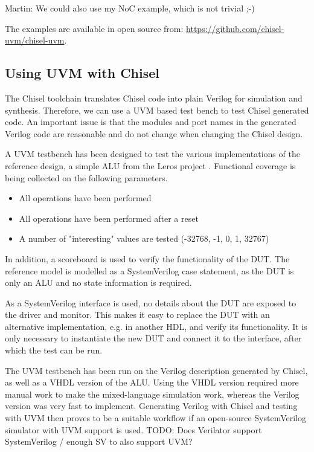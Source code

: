\documentclass[a4paper, conference]{IEEEtran}
\newcommand{\todo}[1]{{\color{olive} TODO: #1}}
\newcommand{\martin}[1]{{\color{blue} Martin: #1}}
\begin{document}
\martin{We could also use my NoC example, which is not trivial ;-)}

The examples are available in open source from: \url{https://github.com/chisel-uvm/chisel-uvm}.

\subsection{Using UVM with Chisel}

The Chisel toolchain translates Chisel code into plain Verilog for simulation and synthesis. Therefore, we can use a UVM based test bench to test Chisel generated code.
An important issue is that the modules and port names in the generated Verilog code are reasonable and do not change when changing the Chisel design.

A UVM testbench has been designed to test the various implementations of the reference design, a simple ALU from the Leros project \cite{leros:fpl2011}. Functional coverage is being collected on the following parameters.
\begin{itemize}
    \item All operations have been performed
    \item All operations have been performed after a reset
    \item A number of "interesting" values are tested (-32768, -1, 0, 1, 32767)
\end{itemize}

In addition, a scoreboard is used to verify the functionality of the DUT. The reference model is modelled as a SystemVerilog case statement, as the DUT is only an ALU and no state information is required.

As a SystemVerilog interface is used, no details about the DUT are exposed to the driver and monitor. This makes it easy to replace the DUT with an alternative implementation, e.g. in another HDL, and verify its functionality. It is only necessary to instantiate the new DUT and connect it to the interface, after which the test can be run.

The UVM testbench has been run on the Verilog description generated by Chisel, as well as a VHDL version of the ALU. Using the VHDL version required more manual work to make the mixed-language simulation work, whereas the Verilog version was very fast to implement. Generating Verilog with Chisel and testing with UVM then proves to be a suitable workflow if an open-source SystemVerilog simulator with UVM support is used. \todo{Does Verilator support SystemVerilog / enough SV to also support UVM?}
\end{document}
